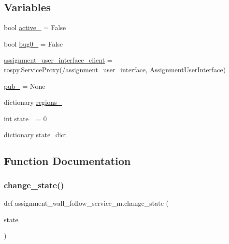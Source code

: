 \subsection*{Variables}
\begin{DoxyCompactItemize}
\item 
bool \hyperlink{namespaceassignment__wall__follow__service__m_af3942bab05dffdd5eabf2c01b1a5d4a4}{active\+\_\+} = False
\item 
bool \hyperlink{namespaceassignment__wall__follow__service__m_a05d2b068382c5cab51fb1ddcbf4bcc48}{bug0\+\_\+} = False
\item 
\hyperlink{namespaceassignment__wall__follow__service__m_aa3f39cbcae4d499f3050bdb59bd9e83a}{assignment\+\_\+user\+\_\+interface\+\_\+client} = rospy.\+Service\+Proxy(\textquotesingle{}/assignment\+\_\+user\+\_\+interface\textquotesingle{}, Assignment\+User\+Interface)
\item 
\hyperlink{namespaceassignment__wall__follow__service__m_a340558239f75efd920e0cbb49abd43e2}{pub\+\_\+} = None
\item 
dictionary \hyperlink{namespaceassignment__wall__follow__service__m_a8123bb7a16180e4dbac3a4fcce4fe2f6}{regions\+\_\+}
\item 
int \hyperlink{namespaceassignment__wall__follow__service__m_a587ec64501750fd3200e0b6edec6aea1}{state\+\_\+} = 0
\item 
dictionary \hyperlink{namespaceassignment__wall__follow__service__m_a94786d0623020a8a9d5b6e1cb6f85634}{state\+\_\+dict\+\_\+}
\end{DoxyCompactItemize}


\subsection{Function Documentation}
\mbox{\label{namespaceassignment__wall__follow__service__m_a0b1ad57ec76ad9ff34883a865e92fd5c}} 
\subsubsection{\texorpdfstring{change\+\_\+state()}{change\_state()}}
{\footnotesize\ttfamily def assignment\+\_\+wall\+\_\+follow\+\_\+service\+\_\+m.\+change\+\_\+state (\begin{DoxyParamCaption}\item[{}]{state }\end{DoxyParamCaption})}

